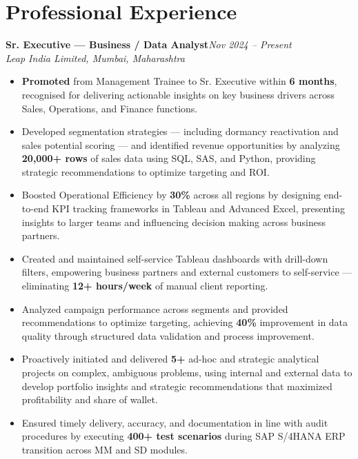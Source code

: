 \documentclass[10pt, letterpaper]{article}
\newcommand{\role}[3]{%
  \vspace{2pt}%
  {\bfseries #1}\hfill{\small\color{muted}\textit{#3}}\\[-2pt]%
  {\small\color{muted}\textit{#2}}%
}
\begin{document}
\section{Professional Experience}

\role{Sr. Executive — Business / Data Analyst}{Leap India Limited, Mumbai, Maharashtra}{Nov 2024 – Present}

\begin{itemize}
  \item \textbf{Promoted} from Management Trainee to Sr. Executive within \textbf{6 months}, recognised for delivering actionable insights on key business drivers across Sales, Operations, and Finance functions.
  \item Developed segmentation strategies — including dormancy reactivation and sales potential scoring — and identified revenue opportunities by analyzing \textbf{20,000+ rows} of sales data using SQL, SAS, and Python, providing strategic recommendations to optimize targeting and ROI.
  \item Boosted Operational Efficiency by \textbf{30\%} across all regions by designing end-to-end KPI tracking frameworks in Tableau and Advanced Excel, presenting insights to larger teams and influencing decision making across business partners.
  \item Created and maintained self-service Tableau dashboards with drill-down filters, empowering business partners and external customers to self-service — eliminating \textbf{12+ hours/week} of manual client reporting.
  \item Analyzed campaign performance across segments and provided recommendations to optimize targeting, achieving \textbf{40\%} improvement in data quality through structured data validation and process improvement.
  \item Proactively initiated and delivered \textbf{5+} ad-hoc and strategic analytical projects on complex, ambiguous problems, using internal and external data to develop portfolio insights and strategic recommendations that maximized profitability and share of wallet.
  \item Ensured timely delivery, accuracy, and documentation in line with audit procedures by executing \textbf{400+ test scenarios} during SAP S/4HANA ERP transition across MM and SD modules.
\end{itemize}

\vspace{1pt}
\end{document}
